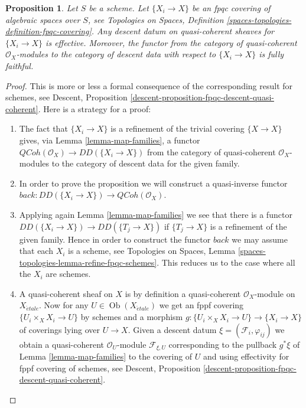 \documentclass{stacks-project}
\theoremstyle{plain}
\newtheorem{proposition}[subsection]{Proposition}
\theoremstyle{definition}
\theoremstyle{remark}
\numberwithin{equation}{subsection}
\def\Ob{\mathop{\mathrm{Ob}}\nolimits}
\def\etale{{\acute{e}tale}}
\def\QCoh{\mathit{QCoh}}
\begin{document}
\begin{proposition}
\label{proposition-fpqc-descent-quasi-coherent}
Let $S$ be a scheme.
Let $\{X_i \to X\}$ be an fpqc covering of algebraic spaces over $S$, see
Topologies on Spaces,
Definition \ref{spaces-topologies-definition-fpqc-covering}.
Any descent datum on quasi-coherent sheaves
for $\{X_i \to X\}$ is effective.
Moreover, the functor from the category of
quasi-coherent $\mathcal{O}_X$-modules to the category
of descent data with respect to $\{X_i \to X\}$ is fully faithful.
\end{proposition}

\begin{proof}
This is more or less a formal consequence of
the corresponding result for schemes, see
Descent, Proposition \ref{descent-proposition-fpqc-descent-quasi-coherent}.
Here is a strategy for a proof:
\begin{enumerate}
\item The fact that $\{X_i \to X\}$ is a refinement of the trivial
covering $\{X \to X\}$ gives, via
Lemma \ref{lemma-map-families},
a functor $\QCoh(\mathcal{O}_X) \to DD(\{X_i \to X\})$ from the
category of quasi-coherent $\mathcal{O}_X$-modules to the category of
descent data for the given family.
\item In order to prove the proposition we will construct a
quasi-inverse functor
$back : DD(\{X_i \to X\}) \to \QCoh(\mathcal{O}_X)$.
\item Applying again
Lemma \ref{lemma-map-families}
we see that there is a functor
$DD(\{X_i \to X\}) \to DD(\{T_j \to X\})$
if $\{T_j \to X\}$ is a refinement of the given family.
Hence in order to construct the functor $back$ we may assume that
each $X_i$ is a scheme, see
Topologies on Spaces,
Lemma \ref{spaces-topologies-lemma-refine-fpqc-schemes}.
This reduces us to the case where all the $X_i$ are schemes.
\item A quasi-coherent sheaf on $X$ is by definition a quasi-coherent
$\mathcal{O}_X$-module on $X_\etale$. Now for any
$U \in \Ob(X_\etale)$ we get an fppf covering
$\{U_i \times_X X_i \to U\}$ by schemes and a morphism
$g : \{U_i \times_X X_i \to U\} \to \{X_i \to X\}$ of coverings
lying over $U \to X$. Given a descent datum
$\xi = (\mathcal{F}_i, \varphi_{ij})$ we obtain a quasi-coherent
$\mathcal{O}_U$-module $\mathcal{F}_{\xi, U}$ corresponding
to the pullback $g^*\xi$ of
Lemma \ref{lemma-map-families}
to the covering of $U$ and using effectivity for fppf covering of schemes, see
Descent, Proposition \ref{descent-proposition-fpqc-descent-quasi-coherent}.

\end{enumerate}
\end{proof}
\end{document}
